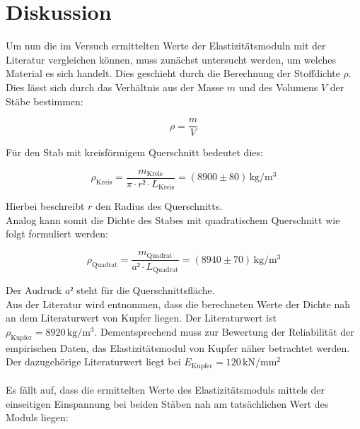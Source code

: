


\section{Diskussion}
\label{sec:Diskussion}

Um nun die im Versuch ermittelten Werte der Elastizitätsmoduln mit der Literatur vergleichen können, muss
zunächst untersucht werden, um welches Material es sich handelt. Dies geschieht durch die Berechnung der Stoffdichte $\rho$.
Dies lässt sich durch das Verhältnis aus der Masse $m$ und des Volumens $V$ der Stäbe bestimmen:

\begin{equation*}
    \rho = \frac{m}{V}
\end{equation*}

\noindent Für den Stab mit kreisförmigem Querschnitt bedeutet dies:

\begin{equation}
    \rho_\text{Kreis} = \frac{m_\text{Kreis}}{\pi\cdot r²\cdot L_\text{Kreis}} = (8900 \pm 80)\,\unit{\kilo\gram\per\cubic\meter}
\end{equation}

\noindent Hierbei beschreibt $r$ den Radius des Querschnitts.\\
Analog kann somit die Dichte des Stabes mit quadratischem Querschnitt wie folgt formuliert werden:

\begin{equation}
    \rho_\text{Quadrat} = \frac{m_\text{Quadrat}}{a²\cdot L_\text{Quadrat}} = (8940 \pm 70)\,\unit{\kilo\gram\per\cubic\meter}
\end{equation}

\noindent Der Audruck $a²$ steht für die Querschnittsfläche.\\
Aus der Literatur \cite{Dichte_Kupfer} wird entnommen, dass die berechneten Werte der Dichte nah an dem Literaturwert von Kupfer liegen.
Der Literaturwert ist $\rho_\text{Kupfer} = 8920\,\unit{\kilo\gram\per\cubic\meter}$. Dementsprechend muss zur Bewertung der Reliabilität der
empirischen Daten, das Elastizitätsmodul von Kupfer näher betrachtet werden. Der dazugehörige Literaturwert \cite{Modul_Kupfer} liegt bei
$E_\text{Kupfer} = 120\,\unit{\kilo\newton\per\milli\meter\squared}$\\\\

\noindent Es fällt auf, dass die ermittelten Werte des Elastizitätsmoduls mittels der einseitigen Einspannung bei beiden Stäben nah am 
tatsächlichen Wert des Moduls liegen:

